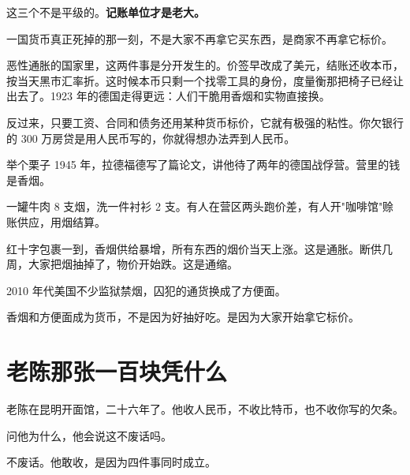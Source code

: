 这三个不是平级的。\textbf{记账单位才是老大。}

一国货币真正死掉的那一刻，不是大家不再拿它买东西，是商家不再拿它标价。

恶性通胀的国家里，这两件事是分开发生的。价签早改成了美元，结账还收本币，按当天黑市汇率折。这时候本币只剩一个找零工具的身份，度量衡那把椅子已经让出去了。1923 年的德国走得更远：人们干脆用香烟和实物直接换。

反过来，只要工资、合同和债务还用某种货币标价，它就有极强的粘性。你欠银行的 300 万房贷是用人民币写的，你就得想办法弄到人民币。

\begin{egbox}{举个栗子}
1945 年，拉德福德写了篇论文，讲他待了两年的德国战俘营。营里的钱是香烟。

一罐牛肉 8 支烟，洗一件衬衫 2 支。有人在营区两头跑价差，有人开"咖啡馆"赊账供应，用烟结算。

红十字包裹一到，香烟供给暴增，所有东西的烟价当天上涨。这是通胀。断供几周，大家把烟抽掉了，物价开始跌。这是通缩。

2010 年代美国不少监狱禁烟，囚犯的通货换成了方便面。

香烟和方便面成为货币，不是因为好抽好吃。是因为大家开始拿它标价。

\end{egbox}

\section{老陈那张一百块凭什么}

老陈在昆明开面馆，二十六年了。他收人民币，不收比特币，也不收你写的欠条。

问他为什么，他会说这不废话吗。

不废话。他敢收，是因为四件事同时成立。

\begin{flowlist}
\end{flowlist}

